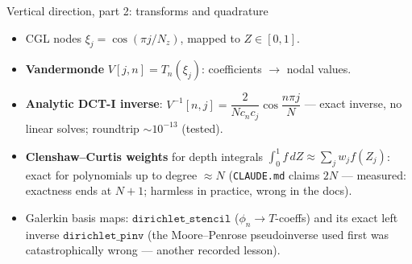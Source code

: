 \documentclass[aspectratio=169,10pt]{beamer}
\newcommand{\file}[1]{\textcolor{blue!60!black}{\texttt{#1}}}
\begin{document}
\begin{frame}{Vertical direction, part 2: transforms and quadrature}
  \begin{itemize}
    \item CGL nodes $\xi_j = \cos(\pi j/N_z)$, mapped to $Z\in[0,1]$.
    \item \textbf{Vandermonde} $V[j,n] = T_n(\xi_j)$: coefficients $\to$ nodal values.
    \item \textbf{Analytic DCT-I inverse}:
      $V^{-1}[n,j] = \dfrac{2}{N c_n c_j}\cos\dfrac{n\pi j}{N}$ --- exact inverse,
      no linear solves; roundtrip $\sim10^{-13}$ (tested).
    \item \textbf{Clenshaw--Curtis weights} for depth integrals
      $\int_0^1 f\,dZ \approx \sum_j w_j f(Z_j)$: exact for polynomials up to
      degree $\approx N$ ({\footnotesize \file{CLAUDE.md} claims $2N$ --- measured:
      exactness ends at $N{+}1$; harmless in practice, wrong in the docs}).
    \item Galerkin basis maps: $\texttt{dirichlet\_stencil}$ ($\phi_n \to T$-coeffs)
      and its exact left inverse $\texttt{dirichlet\_pinv}$
      ({\footnotesize the Moore--Penrose pseudoinverse used first was catastrophically
      wrong --- another recorded lesson}).
  \end{itemize}
\end{frame}
\end{document}
